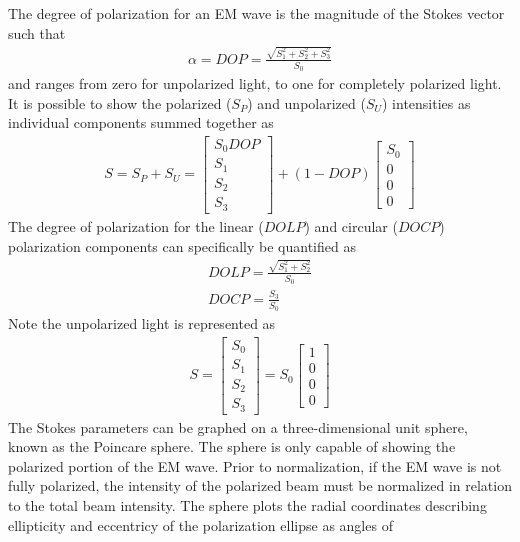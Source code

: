 %
The degree of polarization for an EM wave is the magnitude of the Stokes vector such that
%
\begin{align}
    \alpha =DOP=  \frac{\sqrt{S_1^2+S_2^2+S_3^2 }}{S_0}
\end{align}
%
and ranges from zero for unpolarized light, to one for completely polarized light.  It is possible to show the polarized ($S_P$) and unpolarized ($S_U$) intensities as individual components
summed together as
%
\begin{align}
    S=S_P+S_U=
    \begin{bmatrix}
        S_0 DOP \\
        S_1 \\
        S_2 \\
        S_3
    \end{bmatrix}
    +(1-DOP)
    \begin{bmatrix}
        S_0 \\
        0 \\
        0 \\
        0
    \end{bmatrix}
\end{align}
%
The degree of polarization for the linear ($DOLP$) and circular ($DOCP$) polarization components can specifically be quantified as
%
\begin{align}
    DOLP=  \frac{\sqrt{S_1^2+S_2^2 }}{S_0} \\
    DOCP=  \frac{S_3}{S_0}
\end{align}
%
Note the unpolarized light is represented as
%
\begin{align}
    S=
    \begin{bmatrix}
        S_0 \\
        S_1 \\
        S_2 \\
        S_3
    \end{bmatrix}
    = S_0
    \begin{bmatrix}
        1 \\
        0 \\
        0 \\
        0
    \end{bmatrix}
\end{align}
%
The Stokes parameters can be graphed on a three-dimensional unit sphere, known as the Poincare sphere. The sphere is only capable of showing the polarized portion of the EM wave.  Prior to normalization, if the EM wave is not fully polarized, the intensity of the polarized beam must be normalized in relation to the total beam intensity. The sphere plots the radial coordinates describing ellipticity and eccentricy of the polarization ellipse as angles of
